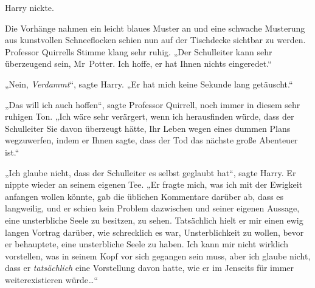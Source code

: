 Harry nickte.

Die Vorhänge nahmen ein leicht blaues Muster an und eine schwache Musterung aus kunstvollen Schneeflocken schien nun auf der Tischdecke sichtbar zu werden. Professor Quirrells Stimme klang sehr ruhig. „Der Schulleiter kann sehr überzeugend sein, Mr~Potter. Ich hoffe, er hat Ihnen nichts eingeredet.“

„Nein, \emph{Verdammt}“, sagte Harry. „Er hat mich keine Sekunde lang getäuscht.“

„Das will ich auch hoffen“, sagte Professor Quirrell, noch immer in diesem sehr ruhigen Ton. „Ich wäre sehr verärgert, wenn ich herausfinden würde, dass der Schulleiter Sie davon überzeugt hätte, Ihr Leben wegen eines dummen Plans wegzuwerfen, indem er Ihnen sagte, dass der Tod das nächste große Abenteuer ist.“

„Ich glaube nicht, dass der Schulleiter es selbst geglaubt hat“, sagte Harry. Er nippte wieder an seinem eigenen Tee. „Er fragte mich, was ich mit der Ewigkeit anfangen wollen könnte, gab die üblichen Kommentare darüber ab, dass es langweilig, und er schien kein Problem dazwischen und seiner eigenen Aussage, eine unsterbliche Seele zu besitzen, zu sehen. Tatsächlich hielt er mir einen ewig langen Vortrag darüber, wie schrecklich es war, Unsterblichkeit zu wollen, bevor er behauptete, eine unsterbliche Seele zu haben. Ich kann mir nicht wirklich vorstellen, was in seinem Kopf vor sich gegangen sein muss, aber ich glaube nicht, dass er \emph{tatsächlich} eine Vorstellung davon hatte, wie er im Jenseits für immer weiterexistieren würde…“

